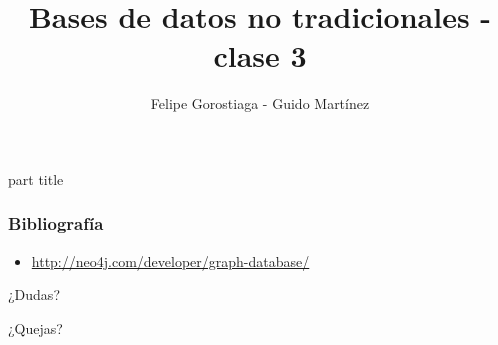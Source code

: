 \documentclass[obeyspaces,spaces,hyphens,handout]{beamer}
\begin{document}
\title{Bases de datos no tradicionales - clase 3}
\author{Felipe Gorostiaga - Guido Martínez}

\begin{frame}
  \titlepage
\end{frame}

\AtBeginSection{\frame{\sectionpage}}

{
	\begin{centering}
	\begin{beamercolorbox}[sep=12pt,center]{part title}
	\bf{\insertsection}\par
	\end{beamercolorbox}
	\end{centering}
}

\newcommand{\dquote}{\texttt{\char`\"}}



\begin{frame}
\frametitle{Bibliografía}
\begin{itemize}
	\footnotesize
	\item \url{http://neo4j.com/developer/graph-database/}
\end{itemize}
\end{frame}

\begin{frame}
\begin{center}
	¿Dudas?
	\pause

	¿Quejas?
\end{center}
\end{frame}
\end{document}
